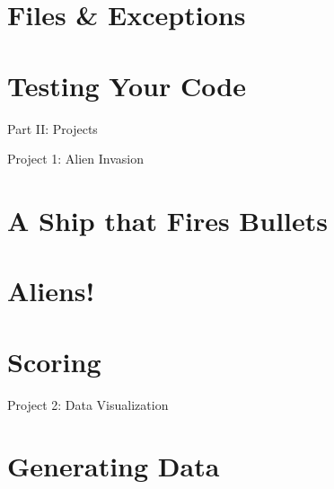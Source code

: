 \documentclass[oneside]{book}
\numberwithin{equation}{section}
\begin{document}

\section{Files \& Exceptions}


\section{Testing Your Code}


\begin{center}
	\huge Part II: Projects
\end{center}

\begin{center}
	\Large Project 1: Alien Invasion
\end{center}

\section{A Ship that Fires Bullets}


\section{Aliens!}


\section{Scoring}


\begin{center}
	\Large Project 2: Data Visualization
\end{center}

\section{Generating Data}
\end{document}

